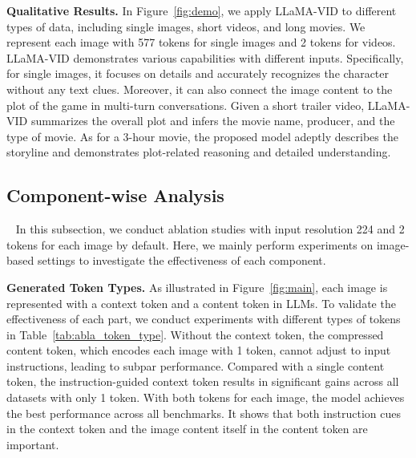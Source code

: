 \noindent
\textbf{Qualitative Results.}
In Figure~\ref{fig:demo}, we apply LLaMA-VID to different types of data, including single images, short videos, and long movies.
We represent each image with 577 tokens for single images and 2 tokens for videos.
LLaMA-VID demonstrates various capabilities with different inputs.
Specifically, for single images, it focuses on details and accurately recognizes the character without any text clues.
Moreover, it can also connect the image content to the plot of the game in multi-turn conversations.
Given a short trailer video, LLaMA-VID summarizes the overall plot and infers the movie name, producer, and the type of movie. 
As for a 3-hour movie, the proposed model adeptly describes the storyline and demonstrates plot-related reasoning and detailed understanding.

\subsection{Component-wise Analysis}~\label{sec:exp_abla}
In this subsection, we conduct ablation studies with input resolution 224 and 2 tokens for each image by default.
Here, we mainly perform experiments on image-based settings to investigate the effectiveness of each component.

\vspace{1.0em}
\noindent
\textbf{Generated Token Types.}
As illustrated in Figure~\ref{fig:main}, each image is represented with a context token and a content token in LLMs.
To validate the effectiveness of each part, we conduct experiments with different types of tokens in Table~\ref{tab:abla_token_type}. 
Without the context token, the compressed content token, which encodes each image with 1 token, cannot adjust to input instructions, leading to subpar performance.
Compared with a single content token, the instruction-guided context token results in significant gains across all datasets with only 1 token.
With both tokens for each image, the model achieves the best performance across all benchmarks.
It shows that both instruction cues in the context token and the image content itself in the content token are important.

\begin{table}[t]
 \centering
 \caption{Comparison with different token types.
We report results with 1 {\em context} token (if exists) and 1 {\em content} token.
 }
 \label{tab:abla_token_type}
\end{table}

